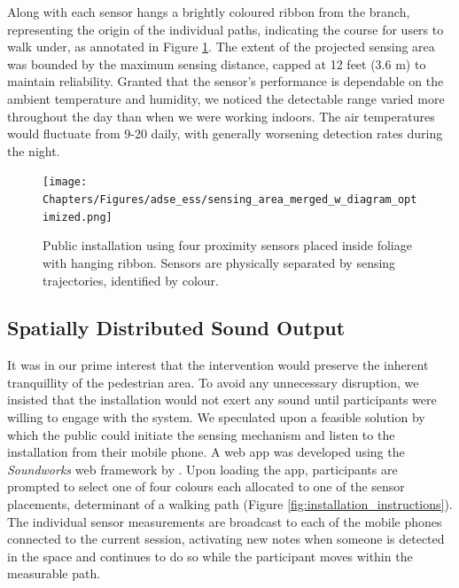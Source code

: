 Along with each sensor hangs a brightly coloured ribbon from the branch, representing the origin of the individual paths, indicating the course for users to walk under, as annotated in Figure \ref{fig:installation_sensor_setup}. The extent of the projected sensing area was bounded by the maximum sensing distance, capped at 12 feet (3.6 m) to maintain reliability. Granted that the sensor's performance is dependable on the ambient temperature and humidity, we noticed the detectable range varied more throughout the day than when we were working indoors. The air temperatures would fluctuate from 9-20 \celsius  daily, with generally worsening detection rates during the night.

\begin{figure}[!h]
\centering
\texttt{[image: Chapters/Figures/adse\_ess/sensing\_area\_merged\_w\_diagram\_optimized.png]}
{
\caption[Public installation using four proximity sensors]{Public installation using four proximity sensors placed inside foliage with hanging ribbon. Sensors are physically separated by sensing trajectories, identified by colour.
}
\label{fig:installation_sensor_setup}
}
\vspace*{-20pt}
\end{figure}

\subsection{Spatially Distributed Sound Output}

It was in our prime interest that the intervention would preserve the inherent tranquillity of the pedestrian area. To avoid any unnecessary disruption, we insisted that the installation would not exert any sound until participants were willing to engage with the system. We speculated upon a feasible solution by which the public could initiate the sensing mechanism and listen to the installation from their mobile phone. A web app was developed using the \textit{Soundworks} web framework by \citeauthor{matuszewski_interaction_2019} \cite{matuszewski_interaction_2019}. Upon loading the app, participants are prompted to select one of four colours each allocated to one of the sensor placements, determinant of a walking path (Figure \ref{fig:installation_instructions}). The individual sensor measurements are broadcast to each of the mobile phones connected to the current session, activating new notes when someone is detected in the space and continues to do so while the participant moves within the measurable path.

